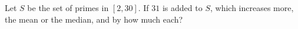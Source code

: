 Let $S$ be the set of primes in $[2,30]$. If $31$ is added to $S$, which increases more, the mean or the median, and by how much each?
